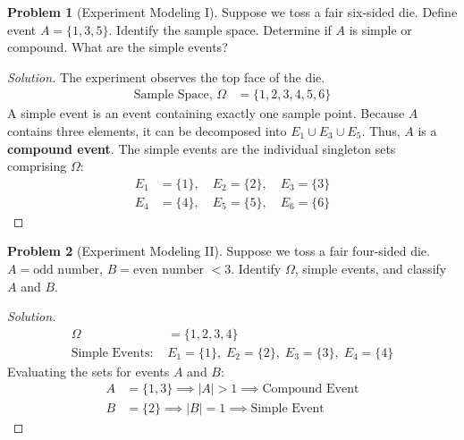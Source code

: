 \documentclass[11pt, letterpaper]{article}
\theoremstyle{definition}
\newtheorem{example}{Problem}
\theoremstyle{remark}
\begin{document}
\begin{example}[Experiment Modeling I]
    Suppose we toss a fair six-sided die. Define event $A = \{1, 3, 5\}$. Identify the sample space. Determine if $A$ is simple or compound. What are the simple events?
\end{example}
\begin{proof}[Solution]
    The experiment observes the top face of the die.
    \begin{align*}
        \text{Sample Space, } \Omega &= \{1, 2, 3, 4, 5, 6\}
    \end{align*}
    A simple event is an event containing exactly one sample point. Because $A$ contains three elements, it can be decomposed into $E_1 \cup E_3 \cup E_5$. Thus, $A$ is a \textbf{compound event}.
    The simple events are the individual singleton sets comprising $\Omega$:
    \begin{align*}
        E_1 &= \{1\}, \quad E_2 = \{2\}, \quad E_3 = \{3\} \\
        E_4 &= \{4\}, \quad E_5 = \{5\}, \quad E_6 = \{6\}
    \end{align*}
\end{proof}

\begin{example}[Experiment Modeling II]
    Suppose we toss a fair four-sided die. $A = \text{odd number}$, $B = \text{even number } < 3$. Identify $\Omega$, simple events, and classify $A$ and $B$.
\end{example}
\begin{proof}[Solution]
    \begin{align*}
        \Omega &= \{1, 2, 3, 4\} \\
        \text{Simple Events: } & E_1=\{1\}, \; E_2=\{2\}, \; E_3=\{3\}, \; E_4=\{4\}
    \end{align*}
    Evaluating the sets for events $A$ and $B$:
    \begin{align*}
        A &= \{1, 3\} \implies |A| > 1 \implies \text{Compound Event} \\
        B &= \{2\} \implies |B| = 1 \implies \text{Simple Event}
    \end{align*}
\end{proof}
\end{document}
